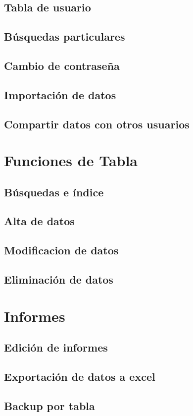 \documentclass[a4paper,10pt]{article}
\begin{document}
\subsection{Tabla de usuario}
\subsection{Búsquedas particulares}
\subsection{Cambio de contraseña}
\subsection{Importación de datos}
\subsection{Compartir datos con otros usuarios}


\section{Funciones de Tabla}
\subsection{Búsquedas e índice}
\subsection{Alta de datos}
\subsection{Modificacion de datos}
\subsection{Eliminación de datos}


\section{Informes}
\subsection{Edición de informes}
\subsection{Exportación de datos a excel}
\subsection{Backup por tabla}
\end{document}
